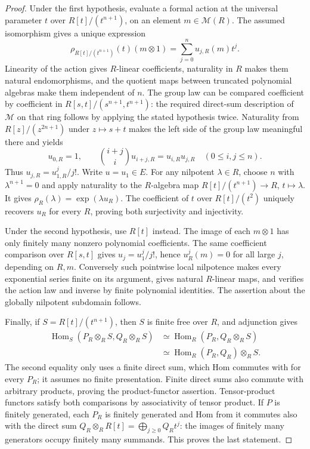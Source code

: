 \begin{proof}
Under the first hypothesis, evaluate a formal action at the universal parameter $t$ over $R[t]/(t^{n+1})$, on an element $m\in\mathcal M(R)$. The assumed isomorphism gives a unique expression
\[
 \rho_{R[t]/(t^{n+1})}(t)(m\otimes1)
       =\sum_{j=0}^n u_{j,R}(m)t^j.
\]
Linearity of the action gives $R$-linear coefficients, naturality in $R$ makes them natural endomorphisms, and the quotient maps between truncated polynomial algebras make them independent of $n$. The group law can be compared coefficient by coefficient in
$R[s,t]/(s^{n+1},t^{n+1})$: the required direct-sum description of $\mathcal M$ on that ring follows by applying the stated hypothesis twice. Naturality from $R[z]/(z^{2n+1})$ under $z\mapsto s+t$ makes the left side of the group law meaningful there and yields
\[
 u_{0,R}=1,\qquad \binom{i+j}{i}u_{i+j,R}=u_{i,R}u_{j,R}
 \quad(0\le i,j\le n).
\]
Thus $u_{j,R}=u_{1,R}^j/j!$. Write $u=u_1\in E$. For any nilpotent $\lambda\in R$, choose $n$ with $\lambda^{n+1}=0$ and apply naturality to the $R$-algebra map $R[t]/(t^{n+1})\to R$, $t\mapsto\lambda$. It gives $\rho_R(\lambda)=\exp(\lambda u_R)$. The coefficient of $t$ over $R[t]/(t^2)$ uniquely recovers $u_R$ for every $R$, proving both surjectivity and injectivity.

Under the second hypothesis, use $R[t]$ instead. The image of each $m\otimes1$ has only finitely many nonzero polynomial coefficients. The same coefficient comparison over $R[s,t]$ gives $u_j=u_1^j/j!$, hence $u_R^j(m)=0$ for all large $j$, depending on $R,m$. Conversely such pointwise local nilpotence makes every exponential series finite on its argument, gives natural $R$-linear maps, and verifies the action law and inverse by finite polynomial identities. The assertion about the globally nilpotent subdomain follows.

Finally, if $S=R[t]/(t^{n+1})$, then $S$ is finite free over $R$, and adjunction gives
\begin{align*}
 \operatorname{Hom}_S(P_R\otimes_RS,Q_R\otimes_RS)
 &\simeq\operatorname{Hom}_R(P_R,Q_R\otimes_RS)\\
 &\simeq\operatorname{Hom}_R(P_R,Q_R)\otimes_RS.
\end{align*}
The second equality only uses a finite direct sum, which Hom commutes with for every $P_R$; it assumes no finite presentation. Finite direct sums also commute with arbitrary products, proving the product-functor assertion. Tensor-product functors satisfy both comparisons by associativity of tensor product. If $P$ is finitely generated, each $P_R$ is finitely generated and Hom from it commutes also with the direct sum $Q_R\otimes_RR[t]=\bigoplus_{j\ge0}Q_Rt^j$: the images of finitely many generators occupy finitely many summands. This proves the last statement.
\end{proof}

